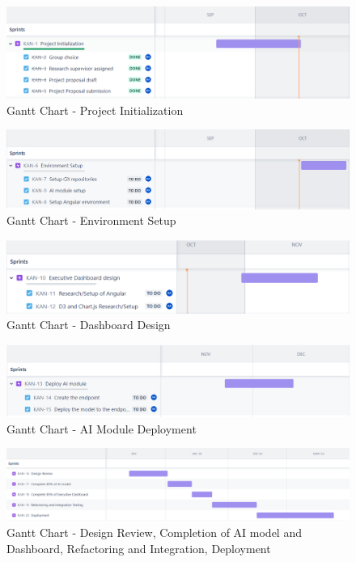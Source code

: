 \documentclass{report}
\begin{document}
\begin{figure}[h]
\includegraphics[scale=0.49]{images/gantt/project_init.png}
\caption{Gantt Chart - Project Initialization}
\label{fig:Project_Init}
\centering
\end{figure}

\begin{figure}[h]
\includegraphics[scale=0.49]{images/gantt/env_setup.png}
\caption{Gantt Chart - Environment Setup}
\label{fig:Env_Setup}
\centering
\end{figure}


\begin{figure}[h]
\includegraphics[scale=0.49]{images/gantt/dash_design.png}
\caption{Gantt Chart - Dashboard Design}
\label{fig:dash_design}
\centering
\end{figure}


\begin{figure}[h]
\includegraphics[scale=0.49]{images/gantt/ai_deploy.png}
\caption{Gantt Chart - AI Module Deployment}
\label{fig:ai_deploy}
\centering
\end{figure}


\begin{figure}[h]
\includegraphics[scale=0.32]{images/gantt/review_deploy.png}
\caption{Gantt Chart - Design Review, Completion of AI model and Dashboard, Refactoring and Integration, Deployment}
\label{fig:review_deploy}
\centering
\end{figure}
\end{document}
